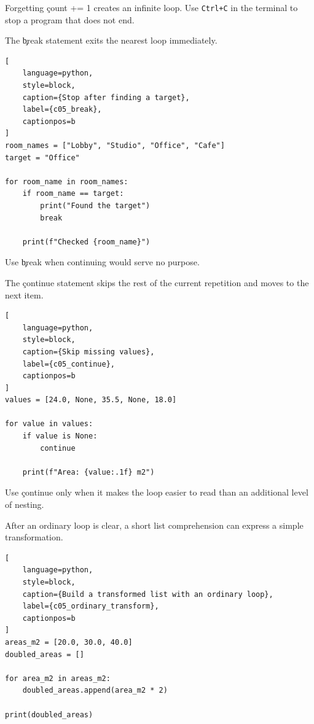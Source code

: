 Forgetting \c{count += 1} creates an infinite loop. Use
\texttt{Ctrl+C} in the terminal to stop a program that does not end.


The \c{break} statement exits the nearest loop immediately.

\begin{lstlisting}[
    language=python,
    style=block,
    caption={Stop after finding a target},
    label={c05_break},
    captionpos=b
]
room_names = ["Lobby", "Studio", "Office", "Cafe"]
target = "Office"

for room_name in room_names:
    if room_name == target:
        print("Found the target")
        break

    print(f"Checked {room_name}")
\end{lstlisting}

Use \c{break} when continuing would serve no purpose.


The \c{continue} statement skips the rest of the current repetition and moves
to the next item.

\begin{lstlisting}[
    language=python,
    style=block,
    caption={Skip missing values},
    label={c05_continue},
    captionpos=b
]
values = [24.0, None, 35.5, None, 18.0]

for value in values:
    if value is None:
        continue

    print(f"Area: {value:.1f} m2")
\end{lstlisting}

Use \c{continue} only when it makes the loop easier to read than an additional
level of nesting.


After an ordinary loop is clear, a short list comprehension can express a
simple transformation.

\begin{lstlisting}[
    language=python,
    style=block,
    caption={Build a transformed list with an ordinary loop},
    label={c05_ordinary_transform},
    captionpos=b
]
areas_m2 = [20.0, 30.0, 40.0]
doubled_areas = []

for area_m2 in areas_m2:
    doubled_areas.append(area_m2 * 2)

print(doubled_areas)
\end{lstlisting}

